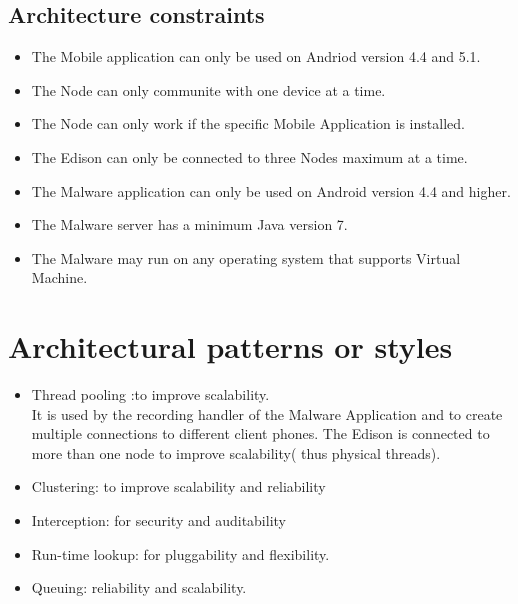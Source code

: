 \documentclass[a4paper,12pt,titlepage]{article}
\begin{document}
\subsection{Architecture constraints}
	\begin{itemize}
		\item The Mobile application can only be used on Andriod version 4.4 and 5.1.
		\item The Node can only communite with one device at a time.
		\item The Node can only work if the specific Mobile Application is installed.
		\item The Edison  can only be connected to three Nodes maximum at a time.
		\item The Malware application can only be used on Android version 4.4 and higher.
		\item The Malware server has a minimum Java version 7.
		\item The Malware may run on any operating system that supports Virtual Machine.

	\end{itemize}
\newpage	\section{Architectural patterns or styles}
\begin{itemize}
\item Thread pooling :to improve scalability. \\It is used by the recording handler of the Malware Application and to create multiple connections to different client phones. The Edison is connected to more than one node to improve scalability( thus physical threads).
\item Clustering: to improve scalability and reliability\\
\item Interception: for security and auditability\\ 
\item Run-time lookup:  for pluggability and flexibility.\\
\item Queuing: reliability and scalability.\\
\end{itemize}
\end{document}
